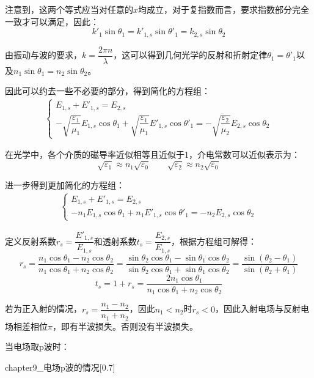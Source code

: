 \begin{prove}
  注意到，这两个等式应当对任意的$x$均成立，对于复指数而言，要求指数部分完全一致才可以满足，因此：
  \[k'_1\sin\theta_1 = k'_{1,s}\sin\theta'_1 = k_{2,s}\sin\theta_2\]

  由振动与波的要求，$k = \dfrac{2\pi n}{\lambda}$，这可以得到几何光学的反射和折射定律$\theta_1 = \theta'_1$以及$n_1\sin\theta_1 = n_2\sin\theta_2$。

  因此可以约去一些不必要的部分，得到简化的方程组：
  \begin{align*}
    \begin{cases}
      E_{1,s} + E'_{1,s} = E_{2,s}\\
      -\sqrt{\dfrac{\varepsilon_1}{\mu_1}}E_{1,s}\cos\theta_1 + \sqrt{\dfrac{\varepsilon_1}{\mu_1}}E'_{1,s}\cos\theta'_1 = -\sqrt{\dfrac{\varepsilon_2}{\mu_2}}E_{2,s}\cos\theta_2
    \end{cases}
  \end{align*}

  在光学中，各个介质的磁导率近似相等且近似于1，介电常数可以近似表示为：
  \[\sqrt{\varepsilon_1} \approx n_1\sqrt{\varepsilon_0}\qquad\sqrt{\varepsilon_2} \approx n_2\sqrt{\varepsilon_0}\]

  进一步得到更加简化的方程组：
  \begin{align*}
    \begin{cases}
      E_{1,s} + E'_{1,s} = E_{2,s}\\
      -n_1 E_{1,s}\cos\theta_1 + n_1 E'_{1,s}\cos\theta'_1 = -n_2 E_{2,s}\cos\theta_2
    \end{cases}
  \end{align*}

  定义反射系数$r_s = \dfrac{E'_{1,s}}{E_{1,s}}$和透射系数$t_s = \dfrac{E_{2,s}}{E_{1,s}}$，根据方程组可解得：
  \[r_s = \dfrac{n_1\cos\theta_1 - n_2\cos\theta_2}{n_1\cos\theta_1 + n_2\cos\theta_2} = \dfrac{\sin\theta_2\cos\theta_1 - \sin\theta_1\cos\theta_2}{\sin\theta_2\cos\theta_1 + \sin\theta_1\cos\theta_2} = \dfrac{\sin(\theta_2 - \theta_1)}{\sin(\theta_2 + \theta_1)}\]
  \[t_s = 1 + r_s = \dfrac{2n_1\cos\theta_1}{n_1\cos\theta_1 + n_2\cos\theta_2}\]

  若为正入射的情况，$r_s = \dfrac{n_1 - n_2}{n_1 + n_2}$，因此$n_1 < n_2$时$r_s < 0$，因此入射电场与反射电场相差相位$\pi$，即有半波损失。否则没有半波损失。

  当电场取p波时：
  \begin{singlefigure}[电场p波的情况]{chapter9_电场p波的情况}[0.7]
  \end{singlefigure}
  

\end{prove}
